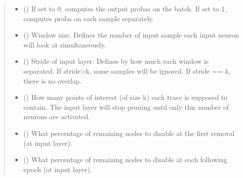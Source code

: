 \documentclass[letterpaper,10pt,english]{sphinxmanual}
\begin{document}
\begin{fulllineitems}
\begin{quote}
\begin{description}
\begin{itemize}
\item {} 
\sphinxAtStartPar
{} (\sphinxstyleliteralemphasis{\sphinxupquote{, }}) \textendash{} If set to 0, computes the output probas on the batch. If set to 1, computes proba on
each sample separately.

\item {} 
\sphinxAtStartPar
{} (\sphinxstyleliteralemphasis{\sphinxupquote{, }}) \textendash{} Window size. Defines the number of input sample each input neuron will look at
simultaneously.

\item {} 
\sphinxAtStartPar
{} (\sphinxstyleliteralemphasis{\sphinxupquote{, }}) \textendash{} Stride of input layer. Defines by how much each window is separated. If stride\textgreater{}k, some samples
will be ignored. If stride == k, there is no overlap.

\item {} 
\sphinxAtStartPar
{} (\sphinxstyleliteralemphasis{\sphinxupquote{, }}) \textendash{} How many points of interest (of size k) each trace is supposed to contain. The
input layer will stop pruning until only this number of neurons are activated.

\item {} 
\sphinxAtStartPar
{} (\sphinxstyleliteralemphasis{\sphinxupquote{, }}) \textendash{} What percentage of remaining nodes to disable at the first removal (at input layer).

\item {} 
\sphinxAtStartPar
{} (\sphinxstyleliteralemphasis{\sphinxupquote{, }}) \textendash{} What percentage of remaining nodes to disable at each following epoch (at input layer).


\end{itemize}
\end{description}
\end{quote}
\end{fulllineitems}
\end{document}
